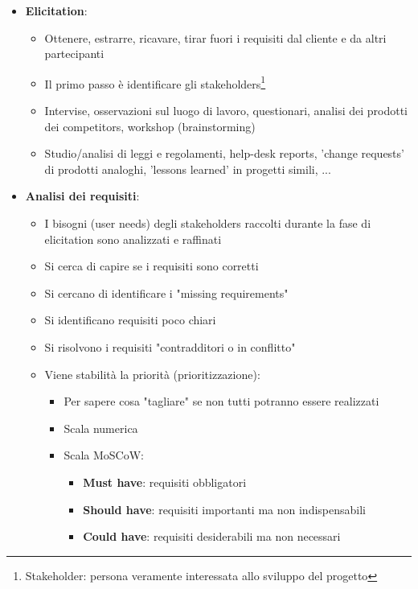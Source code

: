 \documentclass[12pt, a4paper]{report}
\begin{document}
\begin{itemize}
    \item \textbf{Elicitation}: \begin{itemize}
        \item Ottenere, estrarre, ricavare, tirar fuori i requisiti dal cliente e da altri partecipanti
        \item Il primo passo è identificare gli stakeholders\footnote{Stakeholder: persona veramente interessata allo sviluppo del progetto}
        \item Intervise, osservazioni sul luogo di lavoro, questionari, analisi dei prodotti dei competitors, workshop (brainstorming)
        \item Studio/analisi di leggi e regolamenti, help-desk reports, 'change requests' di prodotti analoghi, 'lessons learned' in progetti simili, ...
    \end{itemize}
    \item \textbf{Analisi dei requisiti}: \begin{itemize}
        \item I bisogni (user needs) degli stakeholders raccolti durante la fase di elicitation sono analizzati e raffinati
        \item Si cerca di capire se i requisiti sono corretti
        \item Si cercano di identificare i "missing requirements"
        \item Si identificano requisiti poco chiari
        \item Si risolvono i requisiti "contradditori o in conflitto"
        \item Viene stabilità la priorità (prioritizzazione): \begin{itemize}
            \item Per sapere cosa "tagliare" se non tutti potranno essere realizzati
            \item Scala numerica
            \item Scala MoSCoW: \begin{itemize}
                \item \textbf{Must have}: requisiti obbligatori
                \item \textbf{Should have}: requisiti importanti ma non indispensabili
                \item \textbf{Could have}: requisiti desiderabili ma non necessari
            \end{itemize} 
        \end{itemize}

\end{itemize}
\end{itemize}
\end{document}
